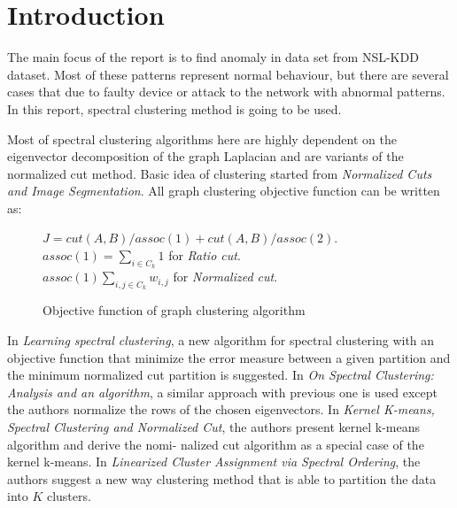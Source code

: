 \section{Introduction}

The main focus of the report is to find anomaly in data set from NSL-KDD dataset. Most of these patterns represent normal behaviour, but there are several cases that due to faulty device or attack to the network with abnormal patterns. In this report, spectral clustering method is going to be used.

Most of spectral clustering algorithms here are highly dependent on the eigenvector decomposition of the graph Laplacian and are variants of the normalized cut method. Basic idea of clustering started from \textit{Normalized Cuts and Image Segmentation}. All graph clustering objective function can be written as: \\

\begin{figure}[ht]
\begin{mdframed}
$J = cut(A,B)/assoc(1) + cut(A,B)/assoc(2)$. \\
$assoc(1) = \sum_{i \in C_k} 1$ for \textit{Ratio cut}.  \\
$assoc(1) \sum_{i,j \in C_k} w_{i,j}$ for \textit{Normalized cut}. \\
\end{mdframed}
\caption{Objective function of graph clustering algorithm}
\end{figure}

In \textit{Learning spectral clustering}, a new algorithm for spectral clustering with an objective function that minimize the error measure between a given partition and the minimum normalized cut partition is suggested. In \textit{On Spectral Clustering: Analysis and an algorithm}, a similar approach with previous one is used except the authors normalize the rows of the chosen eigenvectors. In \textit{Kernel K-means, Spectral Clustering and Normalized Cut}, the authors present kernel k-means algorithm and derive the nomi- nalized cut algorithm as a special case of the kernel k-means. In \textit{Linearized Cluster Assignment via Spectral Ordering}, the authors suggest a new way clustering method that is able to partition the data into $K$ clusters. \\


